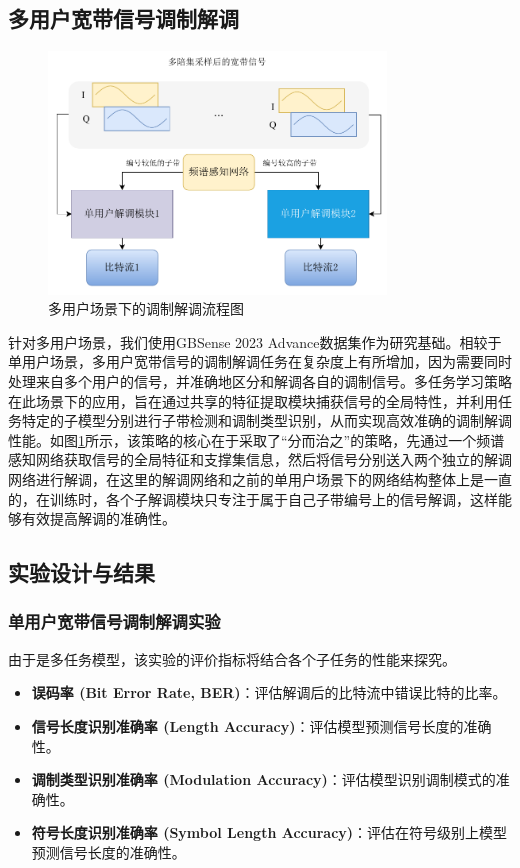 \subsection{多用户宽带信号调制解调}
\begin{figure}
    \centering
    \includegraphics[width=0.8\textwidth]{Image/adamr-wideband_demodulate_mul.pdf}
    \caption{多用户场景下的调制解调流程图}\label{fig:demode_multiple}
\end{figure}

针对多用户场景，我们使用GBSense 2023 Advance数据集作为研究基础。相较于单用户场景，多用户宽带信号的调制解调任务在复杂度上有所增加，因为需要同时处理来自多个用户的信号，并准确地区分和解调各自的调制信号。多任务学习策略在此场景下的应用，旨在通过共享的特征提取模块捕获信号的全局特性，并利用任务特定的子模型分别进行子带检测和调制类型识别，从而实现高效准确的调制解调性能。如图\ref{fig:demode_multiple}所示，该策略的核心在于采取了“分而治之”的策略，先通过一个频谱感知网络获取信号的全局特征和支撑集信息，然后将信号分别送入两个独立的解调网络进行解调，在这里的解调网络和之前的单用户场景下的网络结构整体上是一直的，在训练时，各个子解调模块只专注于属于自己子带编号上的信号解调，这样能够有效提高解调的准确性。

\subsection{实验设计与结果}

\subsubsection{单用户宽带信号调制解调实验}

由于是多任务模型，该实验的评价指标将结合各个子任务的性能来探究。
\begin{itemize}
    \item \textbf{误码率 (Bit Error Rate, BER)}：评估解调后的比特流中错误比特的比率。
    \item \textbf{信号长度识别准确率 (Length Accuracy)}：评估模型预测信号长度的准确性。
    \item \textbf{调制类型识别准确率 (Modulation Accuracy)}：评估模型识别调制模式的准确性。
    \item \textbf{符号长度识别准确率 (Symbol Length Accuracy)}：评估在符号级别上模型预测信号长度的准确性。
\end{itemize}

